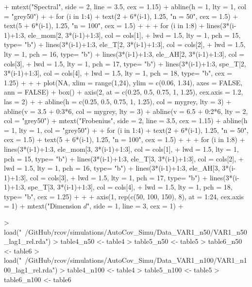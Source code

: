 \documentclass{article}
\begin{document}
\begin{Schunk}
\begin{Sinput}
{+   mtext("Spectral", side = 2, line = 3.5, cex = 1.15)
+   abline(h = 1, lty = 1, col = "grey50")
+ 
+   for (i in 1:4){
+     text(2 + 6*(i-1), 1.25, "n = 50", cex = 1.5)
+     text(5 + 6*(i-1), 1.25, "n = 100", cex = 1.5)
+   }
+ 
+   for (i in 1:8){
+     lines(3*(i-1)+1:3, ele_mom[2, 3*(i-1)+1:3], col = cols[1],
+           lwd = 1.5, lty = 1, pch = 15, type= "b")
+     lines(3*(i-1)+1:3, ele_T[2, 3*(i-1)+1:3], col = cols[2],
+           lwd = 1.5, lty = 1, pch = 16, type= "b")
+     lines(3*(i-1)+1:3, ele_AH[2, 3*(i-1)+1:3], col = cols[3],
+           lwd = 1.5, lty = 1, pch = 17, type= "b")
+     lines(3*(i-1)+1:3, spe_T[2, 3*(i-1)+1:3], col = cols[4],
+           lwd = 1.5, lty = 1, pch = 18, type= "b", cex = 1.25)
+   }
+ 
+   plot(NA, xlim = range(1,24), ylim = c(0.06, 1.34), axes = FALSE, ann = FALSE)
+   box()
+   axis(2, at = c(0.25, 0.5, 0.75, 1, 1.25), cex.axis = 1.2, las = 2)
+ 
+   abline(h = c(0.25, 0.5, 0.75, 1, 1.25), col = mygrey, lty = 3)
+   abline(v = 3.5 + 0:3*6, col = mygrey, lty = 3)
+   abline(v = 6.5 + 0:2*6, lty = 2, col = "grey50")
+   mtext("Frobenius", side = 2, line = 3.5, cex = 1.15)
+   abline(h = 1, lty = 1, col = "grey50")
+ 
+   for (i in 1:4){
+     text(2 + 6*(i-1), 1.25, "n = 50", cex = 1.5)
+     text(5 + 6*(i-1), 1.25, "n = 100", cex = 1.5)
+   }
+ 
+   for (i in 1:8){
+     lines(3*(i-1)+1:3, ele_mom[3, 3*(i-1)+1:3], col = cols[1],
+           lwd = 1.5, lty = 1, pch = 15, type= "b")
+     lines(3*(i-1)+1:3, ele_T[3, 3*(i-1)+1:3], col = cols[2],
+           lwd = 1.5, lty = 1, pch = 16, type= "b")
+     lines(3*(i-1)+1:3, ele_AH[3, 3*(i-1)+1:3], col = cols[3],
+           lwd = 1.5, lty = 1, pch = 17, type= "b")
+     lines(3*(i-1)+1:3, spe_T[3, 3*(i-1)+1:3], col = cols[4],
+           lwd = 1.5, lty = 1, pch = 18, type= "b", cex = 1.25)
+   }
+ 
+   axis(1, rep(c(50, 100, 150), 8), at = 1:24, cex.axis = 1)
+   mtext("Dimension $d$", side = 1, line = 3, cex = 1)
+ }
\end{Sinput}
\end{Schunk}

\begin{Schunk}
\begin{Sinput}
> load("~/GitHub/rcov/simulations/AutoCov_Simu/Data_VAR1_n50/VAR1_n50_lag1_rel.rda")
> table4_n50 <- table4
> table5_n50 <- table5
> table6_n50 <- table6
> load("~/GitHub/rcov/simulations/AutoCov_Simu/Data_VAR1_n100/VAR1_n100_lag1_rel.rda")
> table4_n100 <- table4
> table5_n100 <- table5
> table6_n100 <- table6
\end{Sinput}
\end{Schunk}
\end{document}
